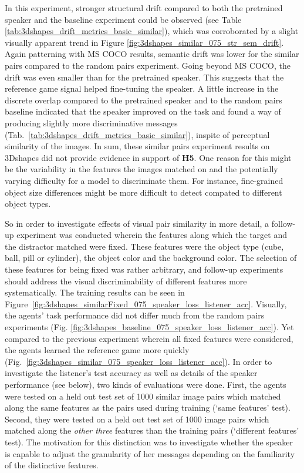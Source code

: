 In this experiment, stronger structural drift compared to both the pretrained speaker and the baseline experiment could be observed (see Table \ref{tab:3dshapes_drift_metrics_basic_similar}), which was corroborated by a slight visually apparent trend in Figure \ref{fig:3dshapes_similar_075_str_sem_drift}. Again patterning with MS COCO results, semantic drift was lower for the similar pairs compared to the random pairs experiment. Going beyond MS COCO, the drift was even smaller than for the pretrained speaker. This suggests that the reference game signal helped fine-tuning the speaker.
A little increase in the discrete overlap compared to the pretrained speaker and to the random pairs baseline indicated that the speaker improved on the task and found a way of producing slightly more discriminative messages (Tab.~\ref{tab:3dshapes_drift_metrics_basic_similar}), inspite of perceptual similarity of the images. In sum, these similar pairs experiment results on 3Dshapes did not provide evidence in support of \textbf{H5}. One reason for this might be the variability in the features the images matched on and the potentially varying difficulty for a model to discriminate them. For instance, fine-grained object size differences might be more difficult to detect compated to different object types.

So in order to investigate effects of visual pair similarity in more detail, a follow-up experiment was conducted wherein the features along which the target and the distractor matched were fixed. These features were the object type (cube, ball, pill or cylinder), the object color and the background color. The selection of these features for being fixed was rather arbitrary, and follow-up experiments should address the visual discriminability of different features more systematically. The training results can be seen in Figure~\ref{fig:3dshapes_similarFixed_075_speaker_loss_listener_acc}. Visually, the agents' task performance did not differ much from the random pairs experiments (Fig. \ref{fig:3dshapes_baseline_075_speaker_loss_listener_acc}). Yet compared to the previous experiment wherein all fixed features were considered, the agents learned the reference game more quickly (Fig.~\ref{fig:3dshapes_similar_075_speaker_loss_listener_acc}). In order to investigate the listener's test accuracy as well as details of the speaker performance (see below), two kinds of evaluations were done. First, the agents were tested on a held out test set of 1000 similar image pairs which matched along the same features as the pairs used during training (`same features' test). Second, they were tested on a held out test set of 1000 image pairs which matched along the \emph{other three} features than the training pairs (`different features' test). The motivation for this distinction was to investigate whether the speaker is capable to adjust the granularity of her messages depending on the familiarity of the distinctive features.

